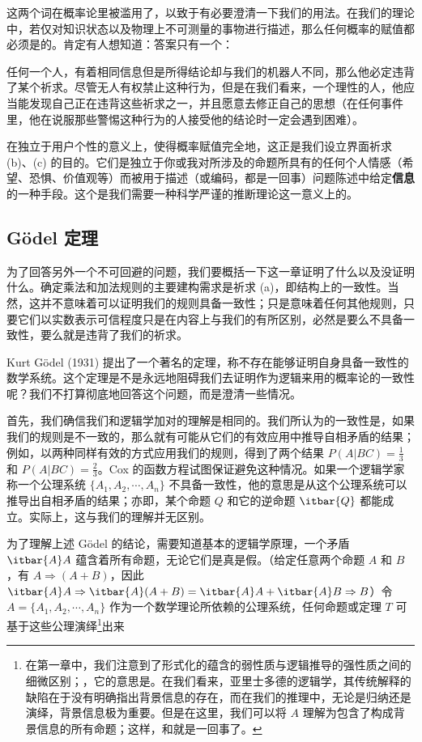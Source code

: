 这两个词在概率论里被滥用了，以致于有必要澄清一下我们的用法。在我们的理论中，若仅对知识状态以及物理上不可测量的事物进行描述，那么任何概率的赋值都必须是的。肯定有人想知道：答案只有一个：

任何一个人，有着相同信息但是所得结论却与我们的机器人不同，那么他必定违背了某个祈求。尽管无人有权禁止这种行为，但是在我们看来，一个理性的人，他应当能发现自己正在违背这些祈求之一，并且愿意去修正自己的思想（在任何事件里，他在说服那些警惕这种行为的人接受他的结论时一定会遇到困难）。

在独立于用户个性的意义上，使得概率赋值完全地，这正是我们设立界面祈求 (b)、(c) 的目的。它们是独立于你或我对所涉及的命题所具有的任何个人情感（希望、恐惧、价值观等）而被用于描述（或编码，都是一回事）问题陈述中给定{\bf 信息}的一种手段。这个是我们需要一种科学严谨的推断理论这一意义上的。

\subsection{G\"odel 定理}

为了回答另外一个不可回避的问题，我们要概括一下这一章证明了什么以及没证明什么。确定乘法和加法规则的主要建构需求是祈求 (a)，即结构上的一致性。当然，这并不意味着可以证明我们的规则具备一致性；只是意味着任何其他规则，只要它们以实数表示可信程度只是在内容上与我们的有所区别，必然是要么不具备一致性，要么就是违背了我们的祈求。

Kurt G\"odel (1931) 提出了一个著名的定理，称不存在能够证明自身具备一致性的数学系统。这个定理是不是永远地阻碍我们去证明作为逻辑来用的概率论的一致性呢？我们不打算彻底地回答这个问题，而是澄清一些情况。

首先，我们确信我们和逻辑学加对的理解是相同的。我们所认为的一致性是，如果我们的规则是不一致的，那么就有可能从它们的有效应用中推导自相矛盾的结果；例如，以两种同样有效的方式应用我们的规则，得到了两个结果 $P(A|BC) = \frac{1}{3}$ 和 $P(A|BC) = \frac{2}{3}$。Cox 的函数方程试图保证避免这种情况。如果一个逻辑学家称一个公理系统 $\{A_1,A_2,\cdots, A_n\}$ 不具备一致性，他的意思是从这个公理系统可以推导出自相矛盾的结果；亦即，某个命题 $Q$ 和它的逆命题 $\itbar{Q}$ 都能成立。实际上，这与我们的理解并无区别。

为了理解上述 G\"odel 的结论，需要知道基本的逻辑学原理，一个矛盾 $\itbar{A}A$ 蕴含着所有命题，无论它们是真是假。（给定任意两个命题 $A$ 和 $B$，有 $A\Rightarrow (A + B)$，因此 $\itbar{A}A\Rightarrow \itbar{A}(A+B) = \itbar{A}A + \itbar{A}B \Rightarrow B$）令 $A=\{A_1,A_2,\cdots,A_n\}$ 作为一个数学理论所依赖的公理系统，任何命题或定理 $T$ 可基于这些公理演绎\footnote{在第一章中，我们注意到了形式化的蕴含的弱性质与逻辑推导的强性质之间的细微区别；，它的意思是。在我们看来，亚里士多德的逻辑学，其传统解释的缺陷在于没有明确指出背景信息的存在，而在我们的推理中，无论是归纳还是演绎，背景信息极为重要。但是在这里，我们可以将 $A$ 理解为包含了构成背景信息的所有命题；这样，和就是一回事了。}出来

